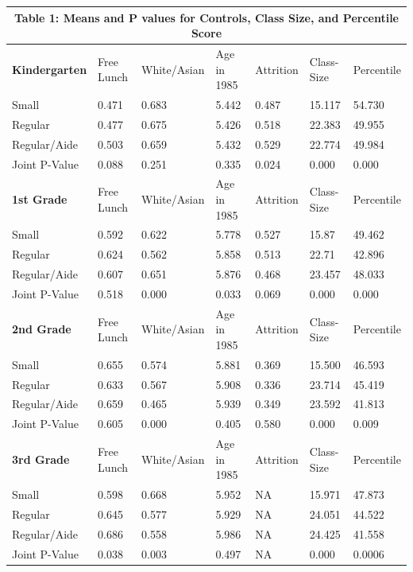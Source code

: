 \documentclass[a4paper,11pt]{article}
\begin{document}
\begin{table}[H]
\begin{center}
\begin{tabular}{l|llllll} 
	\multicolumn{7}{c}{Table 1: Means and P values for Controls, Class Size, and Percentile Score} \\ \hline \hline
	\textbf{Kindergarten} & Free Lunch  & White/Asian  & Age in 1985  & Attrition  & Class-Size  & Percentile  \\  \hline 
	Small & 0.471 & 0.683 & 5.442 & 0.487 & 15.117 & 54.730 \\  
	Regular & 0.477 & 0.675 & 5.426 & 0.518 & 22.383 & 49.955 \\  
	Regular/Aide & 0.503 & 0.659 & 5.432 & 0.529 & 22.774 & 49.984 \\ 
	Joint P-Value & 0.088 & 0.251 & 0.335 & 0.024 & 0.000 & 0.000 \\	\hline \hline
	\textbf{1st Grade}& Free Lunch  & White/Asian  & Age in 1985  & Attrition  & Class-Size  & Percentile  \\  \hline 
	Small & 0.592 & 0.622 & 5.778 & 0.527 & 15.87 & 49.462 \\  
	Regular & 0.624 & 0.562 & 5.858 & 0.513 & 22.71 & 42.896 \\  
	Regular/Aide & 0.607 & 0.651 & 5.876 & 0.468 & 23.457 & 48.033 \\ 
	Joint P-Value & 0.518 & 0.000 & 0.033 & 0.069 & 0.000 & 0.000\\\hline \hline   
	\textbf{2nd Grade} & Free Lunch  & White/Asian  & Age in 1985  & Attrition  & Class-Size  & Percentile  \\  \hline 
	Small & 0.655 & 0.574 & 5.881 & 0.369 & 15.500 & 46.593 \\  
	Regular & 0.633 & 0.567 & 5.908 & 0.336 & 23.714 & 45.419 \\  
	Regular/Aide & 0.659 & 0.465 & 5.939 & 0.349 & 23.592 & 41.813 \\ 
	Joint P-Value & 0.605 & 0.000 & 0.405 & 0.580 & 0.000 & 0.009 \\  \hline \hline 
	\textbf{3rd Grade} & Free Lunch  & White/Asian  & Age in 1985  & Attrition  & Class-Size  & Percentile  \\  \hline 
	Small & 0.598 & 0.668 & 5.952 & NA & 15.971 & 47.873 \\  
	Regular & 0.645 & 0.577 & 5.929 & NA & 24.051 & 44.522 \\  
	Regular/Aide & 0.686 & 0.558 & 5.986 & NA & 24.425 & 41.558 \\
	Joint P-Value & 0.038 & 0.003 & 0.497 & NA & 0.000 & 0.0006 \\  
	\hline \hline 
\end{tabular}
\end{center}
\end{table}
\end{document}
